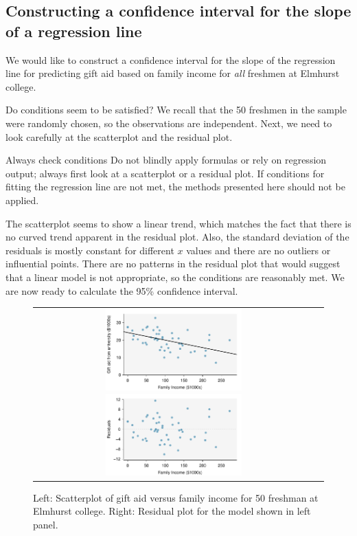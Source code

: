 \subsection{Constructing a confidence interval for the slope of a regression line}

We would like to construct a confidence interval for the slope of the regression line for predicting gift aid based on family income for \emph{all} freshmen at Elmhurst college.  



Do conditions seem to be satisfied?  We recall that the 50 freshmen in the sample were randomly chosen, so the observations are independent.  Next, we need to look carefully at the scatterplot and the residual plot.  


\begin{onebox}{Always check conditions}
Do not blindly apply formulas or rely on regression output; always first look at a scatterplot or a residual plot.  If conditions for fitting the regression line are not met, the methods presented here should not be applied. 
\end{onebox}

The scatterplot seems to show a linear trend, which matches the fact that there is no curved trend apparent in the residual plot.  Also, the standard deviation of the residuals is mostly constant for different $x$ values and there are no outliers or influential points.  There are no patterns in the residual plot that would suggest that a linear model is not appropriate, so the conditions are reasonably met.  We are now ready to calculate the 95\% confidence interval.  

\begin{figure}%
   \centering
  \begin{tabular}{cc}
   \includegraphics[width=0.5\textwidth]{ch_regr_simple_linear/figures/elmhurstInference/elmhurstScatter}
   \includegraphics[width=0.5\textwidth]{ch_regr_simple_linear/figures/elmhurstInference/elmhurstResidual}
\end{tabular}
   \caption{Left: Scatterplot of gift aid versus family income for 50 freshman at Elmhurst college.  Right: Residual plot for the model shown in left panel.  }
\label{elmhurstInferencePlots}
\end{figure}




